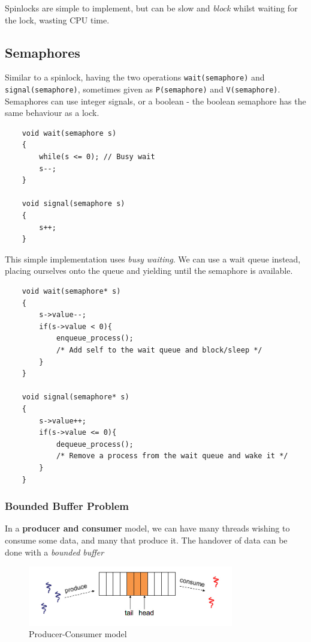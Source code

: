 \documentclass[a4]{article}
\begin{document}
Spinlocks are simple to implement, but can be slow and \emph{block}
whilst waiting for the lock, wasting CPU time.

\subsection{Semaphores}\label{semaphores}

Similar to a spinlock, having the two operations
\texttt{wait(semaphore)} and \texttt{signal(semaphore)}, sometimes given
as \texttt{P(semaphore)} and \texttt{V(semaphore)}. Semaphores can use
integer signals, or a boolean - the boolean semaphore has the same
behaviour as a lock.

\begin{verbatim}
    void wait(semaphore s)
    {
        while(s <= 0); // Busy wait
        s--;
    }

    void signal(semaphore s)
    {
        s++;
    }
\end{verbatim}

This simple implementation uses \emph{busy waiting}. We can use a wait
queue instead, placing ourselves onto the queue and yielding until the
semaphore is available.

\begin{verbatim}
    void wait(semaphore* s)
    {
        s->value--;
        if(s->value < 0){
            enqueue_process();
            /* Add self to the wait queue and block/sleep */
        }
    }

    void signal(semaphore* s)
    {
        s->value++;
        if(s->value <= 0){
            dequeue_process();
            /* Remove a process from the wait queue and wake it */
        }
    }
\end{verbatim}

\subsubsection{Bounded Buffer Problem}\label{bounded-buffer-problem}

In a \textbf{producer and consumer} model, we can have many threads
wishing to consume some data, and many that produce it. The handover of
data can be done with a \emph{bounded buffer}

\begin{figure}[h!]
  \centering
  \includegraphics[width=0.8\textwidth]{produceConsume}
  \caption{Producer-Consumer model}
\end{figure}
\end{document}
